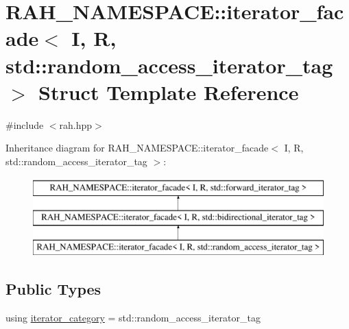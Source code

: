 \hypertarget{struct_r_a_h___n_a_m_e_s_p_a_c_e_1_1iterator__facade_3_01_i_00_01_r_00_01std_1_1random__access__iterator__tag_01_4}{}\section{R\+A\+H\+\_\+\+N\+A\+M\+E\+S\+P\+A\+CE\+::iterator\+\_\+facade$<$ I, R, std\+::random\+\_\+access\+\_\+iterator\+\_\+tag $>$ Struct Template Reference}
\label{struct_r_a_h___n_a_m_e_s_p_a_c_e_1_1iterator__facade_3_01_i_00_01_r_00_01std_1_1random__access__iterator__tag_01_4}


{\ttfamily \#include $<$rah.\+hpp$>$}

Inheritance diagram for R\+A\+H\+\_\+\+N\+A\+M\+E\+S\+P\+A\+CE\+::iterator\+\_\+facade$<$ I, R, std\+::random\+\_\+access\+\_\+iterator\+\_\+tag $>$\+:\begin{figure}[H]
\begin{center}
\leavevmode
\includegraphics[height=3.000000cm]{struct_r_a_h___n_a_m_e_s_p_a_c_e_1_1iterator__facade_3_01_i_00_01_r_00_01std_1_1random__access__iterator__tag_01_4}
\end{center}
\end{figure}
\subsection*{Public Types}
\begin{DoxyCompactItemize}
\item 
using \mbox{\hyperlink{struct_r_a_h___n_a_m_e_s_p_a_c_e_1_1iterator__facade_3_01_i_00_01_r_00_01std_1_1random__access__iterator__tag_01_4_a4fa7b515e853787a85b5ec008b1bb577}{iterator\+\_\+category}} = std\+::random\+\_\+access\+\_\+iterator\+\_\+tag
\end{DoxyCompactItemize}
